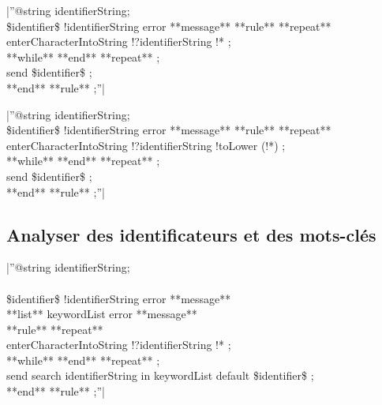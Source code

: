|''@string identifierString;\\ 
\$identifier\$ !identifierString error **message** %
**rule** %
 **repeat**\\ 
  enterCharacterIntoString !?identifierString !* ;\\ 
 **while** %
 **end** **repeat** ;\\ 
 send \$identifier\$ ;\\
**end** **rule** ;''|

|''@string identifierString;\\ 
\$identifier\$ !identifierString error **message** %
**rule** %
 **repeat**\\ 
  enterCharacterIntoString !?identifierString !toLower (!*) ;\\ 
 **while** %
 **end** **repeat** ;\\ 
 send \$identifier\$ ;\\
**end** **rule** ;''|

\subsection{Analyser des identificateurs et des mots-clés}

|''@string identifierString;\\ 
\\ 
\$identifier\$ !identifierString error **message** %
\\ 
**list** keywordList error **message** %
\\ 
**rule** %
 **repeat**\\ 
  enterCharacterIntoString !?identifierString !* ;\\ 
 **while** %
 **end** **repeat** ;\\ 
 send search identifierString in keywordList  default \$identifier\$ ;\\
**end** **rule** ;''|

